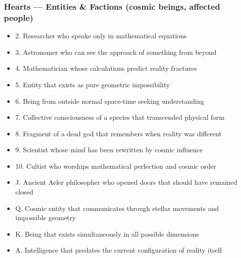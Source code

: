 \documentclass[11pt]{article}
\begin{document}
\subsubsection{Hearts --- Entities \& Factions (cosmic beings, affected people)}
\begin{itemize}[leftmargin=*]
\item 2. Researcher who speaks only in mathematical equations
\item 3. Astronomer who can see the approach of something from beyond
\item 4. Mathematician whose calculations predict reality fractures
\item 5. Entity that exists as pure geometric impossibility
\item 6. Being from outside normal space-time seeking understanding
\item 7. Collective consciousness of a species that transcended physical form
\item 8. Fragment of a dead god that remembers when reality was different
\item 9. Scientist whose mind has been rewritten by cosmic influence
\item 10. Cultist who worships mathematical perfection and cosmic order
\item J. Ancient Aeler philosopher who opened doors that should have remained closed
\item Q. Cosmic entity that communicates through stellar movements and impossible geometry
\item K. Being that exists simultaneously in all possible dimensions
\item A. Intelligence that predates the current configuration of reality itself
\end{itemize}
\end{document}
